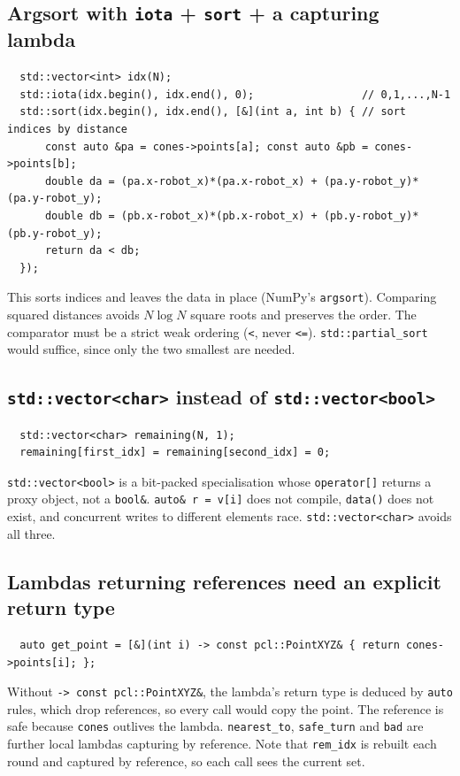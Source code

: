 \documentclass[10pt,a4paper]{scrartcl}
\renewcommand{\emph}[1]{\textcolor{accent}{#1}}
\newcommand{\code}[1]{\texttt{#1}}
\begin{document}
  \subsection{Argsort with \texttt{iota} + \texttt{sort} + a capturing lambda}

  \begin{lstlisting}
  std::vector<int> idx(N);
  std::iota(idx.begin(), idx.end(), 0);                 // 0,1,...,N-1
  std::sort(idx.begin(), idx.end(), [&](int a, int b) { // sort indices by distance
      const auto &pa = cones->points[a]; const auto &pb = cones->points[b];
      double da = (pa.x-robot_x)*(pa.x-robot_x) + (pa.y-robot_y)*(pa.y-robot_y);
      double db = (pb.x-robot_x)*(pb.x-robot_x) + (pb.y-robot_y)*(pb.y-robot_y);
      return da < db;
  });
  \end{lstlisting}
  This sorts \emph{indices} and leaves the data in place (NumPy's \code{argsort}).
  Comparing squared distances avoids $N\log N$ square roots and preserves the order.
  The comparator must be a strict weak ordering (\code{<}, never \code{<=}).
  \code{std::partial\_sort} would suffice, since only the two smallest are needed.

  \subsection{\texttt{std::vector<char>} instead of \texttt{std::vector<bool>}}

  \begin{lstlisting}
  std::vector<char> remaining(N, 1);
  remaining[first_idx] = remaining[second_idx] = 0;
  \end{lstlisting}
  \code{std::vector<bool>} is a bit-packed specialisation whose \code{operator[]}
  returns a proxy object, not a \code{bool\&}. \code{auto\& r = v[i]} does not
  compile, \code{data()} does not exist, and concurrent writes to different elements
  race. \code{std::vector<char>} avoids all three.

  \subsection{Lambdas returning references need an explicit return type}

  \begin{lstlisting}
  auto get_point = [&](int i) -> const pcl::PointXYZ& { return cones->points[i]; };
  \end{lstlisting}
  Without \code{-> const pcl::PointXYZ\&}, the lambda's return type is deduced by
  \code{auto} rules, which drop references, so every call would \emph{copy} the
  point. The reference is safe because \code{cones} outlives the lambda.
  \code{nearest\_to}, \code{safe\_turn} and \code{bad} are further local lambdas
  capturing by reference. Note that \code{rem\_idx} is rebuilt each round and captured
  by reference, so each call sees the current set.
\end{document}
